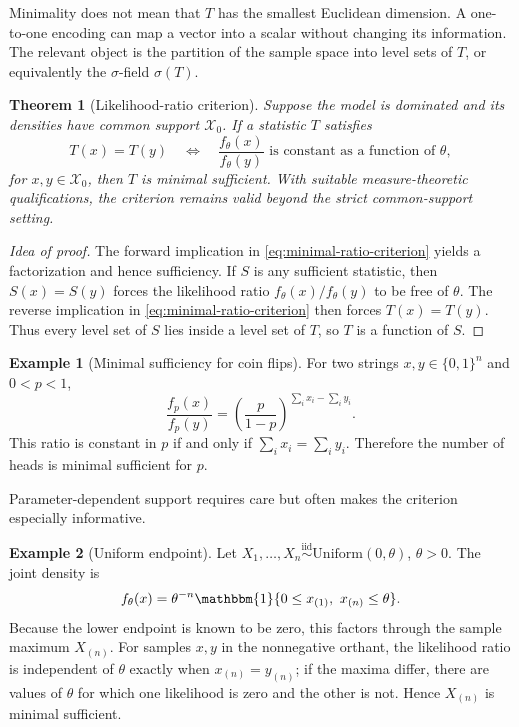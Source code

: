 \documentclass[12pt,oneside]{book}
\numberwithin{equation}{section}
\theoremstyle{definition}
\newtheorem{example}{Example}[section]
\theoremstyle{plain}
\newtheorem{theorem}{Theorem}[section]
\theoremstyle{remark}
\newcommand{\ind}{\mathbbm{1}}
\newcommand{\iid}{\overset{\text{iid}}{\sim}}
\begin{document}
Minimality does not mean that $T$ has the smallest Euclidean dimension.  A
one-to-one encoding can map a vector into a scalar without changing its
information.  The relevant object is the partition of the sample space into
level sets of $T$, or equivalently the $\sigma$-field $\sigma(T)$.

\begin{theorem}[Likelihood-ratio criterion]
Suppose the model is dominated and its densities have common support
$\mathcal X_0$.  If a statistic $T$ satisfies
\begin{equation}
    T(x)=T(y)
    \quad\Longleftrightarrow\quad
    \frac{f_\theta(x)}{f_\theta(y)}
    \text{ is constant as a function of $\theta$},
    \label{eq:minimal-ratio-criterion}
\end{equation}
for $x,y\in\mathcal X_0$, then $T$ is minimal sufficient.  With suitable
measure-theoretic qualifications, the criterion remains valid beyond the
strict common-support setting.
\end{theorem}

\begin{proof}[Idea of proof]
The forward implication in \eqref{eq:minimal-ratio-criterion} yields a
factorization and hence sufficiency.  If $S$ is any sufficient statistic,
then $S(x)=S(y)$ forces the likelihood ratio $f_\theta(x)/f_\theta(y)$ to be
free of $\theta$.  The reverse implication in
\eqref{eq:minimal-ratio-criterion} then forces $T(x)=T(y)$.  Thus every level
set of $S$ lies inside a level set of $T$, so $T$ is a function of $S$.
\end{proof}

\begin{example}[Minimal sufficiency for coin flips]
For two strings $x,y\in\{0,1\}^n$ and $0<p<1$,
\[
    \frac{f_p(x)}{f_p(y)}
    =\left(\frac{p}{1-p}\right)^{\sum_i x_i-\sum_i y_i}.
\]
This ratio is constant in $p$ if and only if
$\sum_i x_i=\sum_i y_i$.  Therefore the number of heads is minimal
sufficient for $p$.
\end{example}

Parameter-dependent support requires care but often makes the criterion
especially informative.

\begin{example}[Uniform endpoint]
Let $X_1,\ldots,X_n\iid\mathrm{Uniform}(0,\theta)$, $\theta>0$.  The joint
density is
\[
    f_\theta(x)=\theta^{-n}
    \ind\{0\leq x_{(1)},\ x_{(n)}\leq\theta\}.
\]
Because the lower endpoint is known to be zero, this factors through the
sample maximum $X_{(n)}$.  For samples $x,y$ in the nonnegative orthant, the
likelihood ratio is independent of $\theta$ exactly when
$x_{(n)}=y_{(n)}$; if the maxima differ, there are values of $\theta$ for
which one likelihood is zero and the other is not.  Hence $X_{(n)}$ is
minimal sufficient.
\end{example}
\end{document}
